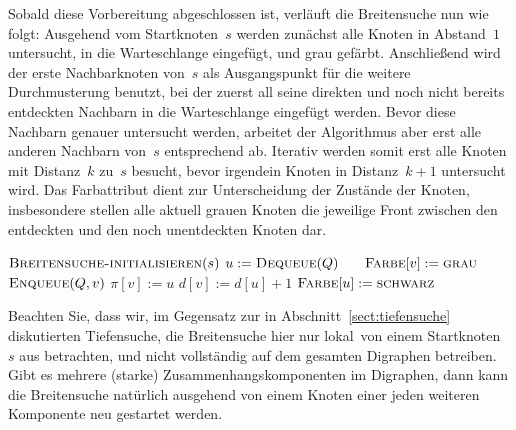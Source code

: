 \begin{bem}
Sobald diese Vorbereitung abgeschlossen ist, verläuft die Breitensuche nun wie folgt:
Ausgehend vom Startknoten~$s$ werden zunächst alle Knoten in Abstand~$1$ untersucht, in die Warteschlange eingefügt, und grau gefärbt.
Anschließend wird der erste Nachbarknoten von~$s$ als Ausgangspunkt für die weitere Durchmusterung benutzt, bei der zuerst all seine direkten und noch nicht bereits entdeckten Nachbarn in die Warteschlange eingefügt werden.
Bevor diese Nachbarn genauer untersucht werden, arbeitet der Algorithmus aber erst alle anderen Nachbarn von~$s$ entsprechend ab.
Iterativ werden somit erst alle Knoten mit Distanz~$k$ zu~$s$ besucht, bevor irgendein Knoten in Distanz~$k+1$ untersucht wird.
Das Farbattribut dient zur Unterscheidung der Zustände der Knoten, insbesondere stellen alle aktuell grauen Knoten die jeweilige Front zwischen den entdeckten und den noch unentdeckten Knoten dar.

\begin{algorithm}[H]
\caption{$\cc{Breitensuche}(s)$}
\begin{algorithmic}[1]
 \STATE $\mathop{\text{\textsc{Breitensuche-initialisieren}}}(s)$
  \STATE\label{line:breitensuche-dequeue} $u:=\mathop{\text{\textsc{Dequeue}}}(Q)$ $\quad$ 
  \STATE {}
   \label{line:breitensuche-if}
    \STATE $\mathop{\text{\textsc{Farbe}}}[v]:=\mathop{\text{\textsc{grau}}}$
    \STATE\label{line:breitensuche-enqueue} $\mathop{\text{\textsc{Enqueue}}}(Q,v)$
    \STATE\label{line:breitensuche-pi} $\pi[v] := u$
    \STATE\label{line:breitensuche-d} $d[v]:=d[u]+1$
   \ENDIF
  \ENDFOR
  \STATE $\mathop{\text{\textsc{Farbe}}}[u]:=\mathop{\text{\textsc{schwarz}}}$
 \ENDWHILE
\end{algorithmic}
\end{algorithm}
\end{bem}

\begin{bem}
Beachten Sie, dass wir, im Gegensatz zur in Abschnitt~\ref{sect:tiefensuche} diskutierten Tiefensuche, die Breitensuche hier nur \glqq lokal\grqq\ von einem Startknoten~$s$ aus betrachten, und nicht vollständig auf dem gesamten Digraphen betreiben.
Gibt es mehrere (starke) Zusammenhangskomponenten im Digraphen, dann kann die Breitensuche natürlich ausgehend von einem Knoten einer jeden weiteren Komponente neu gestartet werden.
\end{bem} 

